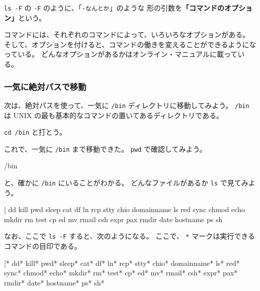  \texttt{ls -F} の \texttt{-F} のように、「\texttt{-なんとか}」のような
形の引数を\textbf{「コマンドのオプション」}という。

コマンドには、それぞれのコマンドによって、いろいろなオプションがある。
そして、オプションを付けると、コマンドの働きを変えることができるようになっている。
どんなオプションがあるかはオンライン・マニュアルに載っている。

\subsubsection{一気に絶対パスで移動}

次は、絶対パスを使って、一気に \texttt{/bin} ディレクトリに移動してみよう。
\texttt{/bin} は UNIX の最も基本的なコマンドの置いてあるディレクトリである。

\texttt{cd /bin} と打とう。

\begin{progls}
%
\end{progls}

これで、一気に \texttt{/bin} まで移動できた。
 \texttt{pwd} で確認してみよう。

\begin{progls}
/bin
%
\end{progls}

と、確かに \texttt{/bin} にいることがわかる。
どんなファイルがあるか \texttt{ls} で見てみよう。

\begin{progls}
[               dd              kill            pwd             sleep
cat             df              ln              rcp             stty
chio            domainname      ls              red             sync
chmod           echo            mkdir           rm              test
cp              ed              mv              rmail
csh             expr            pax             rmdir
date            hostname        ps              sh
%
\end{progls}

なお、ここで \texttt{ls -F} すると、次のようになる。
ここで、 \texttt{*} マークは実行できるコマンドの目印である。

\begin{progls}
[*              dd*             kill*           pwd*            sleep*
cat*            df*             ln*             rcp*            stty*
chio*           domainname*     ls*             red*            sync*
chmod*          echo*           mkdir*          rm*             test*
cp*             ed*             mv*             rmail*
csh*            expr*           pax*            rmdir*
date*           hostname*       ps*             sh*
%
\end{progls}

